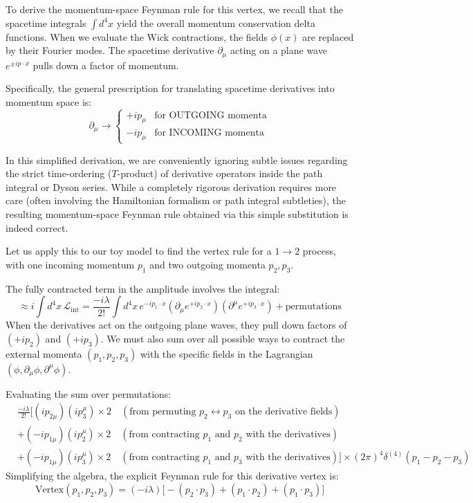 To derive the momentum-space Feynman rule for this vertex, we recall that the spacetime integrals $\int d^4x$ yield the overall momentum conservation delta functions. When we evaluate the Wick contractions, the fields $\phi(x)$ are replaced by their Fourier modes. The spacetime derivative $\partial_\mu$ acting on a plane wave $e^{\pm ip \cdot x}$ pulls down a factor of momentum.

Specifically, the general prescription for translating spacetime derivatives into momentum space is:
\[
    \partial_\mu \to
    \begin{cases}
        +i p_\mu & \text{for OUTGOING momenta} \\
        -i p_\mu & \text{for INCOMING momenta}
    \end{cases}
\]

\begin{remark}
    In this simplified derivation, we are conveniently ignoring subtle issues regarding the strict time-ordering ($T$-product) of derivative operators inside the path integral or Dyson series. While a completely rigorous derivation requires more care (often involving the Hamiltonian formalism or path integral subtleties), the resulting momentum-space Feynman rule obtained via this simple substitution is indeed correct.
\end{remark}

Let us apply this to our toy model to find the vertex rule for a $1 \to 2$ process, with one incoming momentum $p_1$ and two outgoing momenta $p_2, p_3$.

The fully contracted term in the amplitude involves the integral:
\[
    \approx i \int d^4x \, \mathcal{L}_{\text{int}} = \frac{-i\lambda}{2!} \int d^4x \, e^{-ip_1 \cdot x} \left( \partial_\mu e^{+ip_2 \cdot x} \right) \left( \partial^\mu e^{+ip_3 \cdot x} \right) + \text{permutations}
\]
When the derivatives act on the outgoing plane waves, they pull down factors of $(+ip_2)$ and $(+ip_3)$. We must also sum over all possible ways to contract the external momenta $(p_1, p_2, p_3)$ with the specific fields in the Lagrangian $(\phi, \partial_\mu \phi, \partial^\mu \phi)$.

Evaluating the sum over permutations:
\begin{align*}
     & \frac{-i\lambda}{2!} \Big[
    (ip_{2\mu})(ip_3^\mu) \times 2 \quad (\text{from permuting } p_2 \leftrightarrow p_3 \text{ on the derivative fields})  \\
     & + (-ip_{1\mu})(ip_2^\mu) \times 2 \quad (\text{from contracting } p_1 \text{ and } p_2 \text{ with the derivatives}) \\
     & + (-ip_{1\mu})(ip_3^\mu) \times 2 \quad (\text{from contracting } p_1 \text{ and } p_3 \text{ with the derivatives})
        \Big] \times (2\pi)^4 \delta^{(4)}(p_1 - p_2 - p_3)
\end{align*}
Simplifying the algebra, the explicit Feynman rule for this derivative vertex is:
\[
    \text{Vertex}(p_1, p_2, p_3) = (-i\lambda) \big[ -(p_2 \cdot p_3) + (p_1 \cdot p_2) + (p_1 \cdot p_3) \big]
\]

